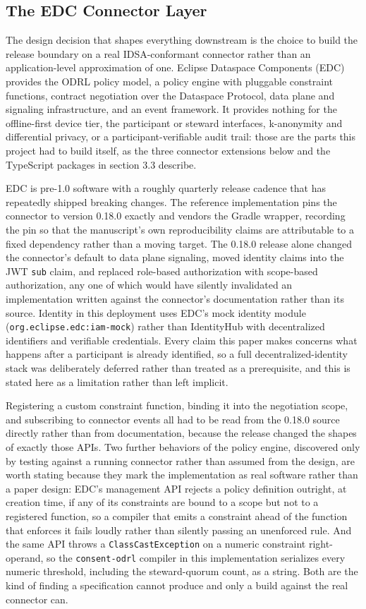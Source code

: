 \subsection{The EDC Connector Layer}

The design decision that shapes everything downstream is the choice to build the release boundary on a real IDSA-conformant connector rather than an application-level approximation of one. Eclipse Dataspace Components (EDC) provides the ODRL policy model, a policy engine with pluggable constraint functions, contract negotiation over the Dataspace Protocol, data plane and signaling infrastructure, and an event framework. It provides nothing for the offline-first device tier, the participant or steward interfaces, k-anonymity and differential privacy, or a participant-verifiable audit trail: those are the parts this project had to build itself, as the three connector extensions below and the TypeScript packages in section 3.3 describe.

EDC is pre-1.0 software with a roughly quarterly release cadence that has repeatedly shipped breaking changes. The reference implementation pins the connector to version 0.18.0 exactly and vendors the Gradle wrapper, recording the pin so that the manuscript's own reproducibility claims are attributable to a fixed dependency rather than a moving target. The 0.18.0 release alone changed the connector's default to data plane signaling, moved identity claims into the JWT \texttt{sub} claim, and replaced role-based authorization with scope-based authorization, any one of which would have silently invalidated an implementation written against the connector's documentation rather than its source. Identity in this deployment uses EDC's mock identity module (\texttt{org.eclipse.edc:iam-mock}) rather than IdentityHub with decentralized identifiers and verifiable credentials. Every claim this paper makes concerns what happens after a participant is already identified, so a full decentralized-identity stack was deliberately deferred rather than treated as a prerequisite, and this is stated here as a limitation rather than left implicit.

Registering a custom constraint function, binding it into the negotiation scope, and subscribing to connector events all had to be read from the 0.18.0 source directly rather than from documentation, because the release changed the shapes of exactly those APIs. Two further behaviors of the policy engine, discovered only by testing against a running connector rather than assumed from the design, are worth stating because they mark the implementation as real software rather than a paper design: EDC's management API rejects a policy definition outright, at creation time, if any of its constraints are bound to a scope but not to a registered function, so a compiler that emits a constraint ahead of the function that enforces it fails loudly rather than silently passing an unenforced rule. And the same API throws a \texttt{ClassCastException} on a numeric constraint right-operand, so the \texttt{consent-odrl} compiler in this implementation serializes every numeric threshold, including the steward-quorum count, as a string. Both are the kind of finding a specification cannot produce and only a build against the real connector can.


